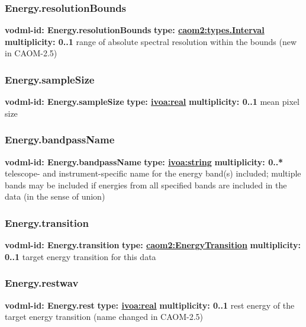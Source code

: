     \subsubsection{Energy.resolutionBounds}
      \textbf{vodml-id: Energy.resolutionBounds} \newline
      \textbf{type: \hyperref[sect:types.Interval]{caom2:types.Interval}} \newline
      \textbf{multiplicity: 0..1} \newline
      range of absolute spectral resolution within the bounds (new in CAOM-2.5)

    \subsubsection{Energy.sampleSize}
      \textbf{vodml-id: Energy.sampleSize} \newline
      \textbf{type: \hyperref[sect:ivoa]{ivoa:real}} \newline
      \textbf{multiplicity: 0..1} \newline
      mean pixel size

    \subsubsection{Energy.bandpassName}
      \textbf{vodml-id: Energy.bandpassName} \newline
      \textbf{type: \hyperref[sect:ivoa]{ivoa:string}} \newline
      \textbf{multiplicity: 0..*} \newline
      telescope- and instrument-specific name for the energy band(s) included; multiple bands may be included if energies from all specified bands are included in the data (in the sense of union)

    \subsubsection{Energy.transition}
      \textbf{vodml-id: Energy.transition} \newline
      \textbf{type: \hyperref[sect:EnergyTransition]{caom2:EnergyTransition}} \newline
      \textbf{multiplicity: 0..1} \newline
      target energy transition for this data

    \subsubsection{Energy.restwav}
      \textbf{vodml-id: Energy.rest} \newline
      \textbf{type: \hyperref[sect:ivoa]{ivoa:real}} \newline
      \textbf{multiplicity: 0..1} \newline
      rest energy of the target energy transition (name changed in CAOM-2.5)

